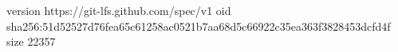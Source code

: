 version https://git-lfs.github.com/spec/v1
oid sha256:51d52527d76fea65c61258ac0521b7aa68d5c66922c35ea363f3828453dcfd4f
size 22357
